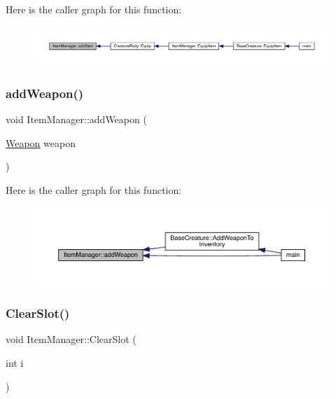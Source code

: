 Here is the caller graph for this function\+:
\nopagebreak
\begin{figure}[H]
\begin{center}
\leavevmode
\includegraphics[width=350pt]{dc/de1/class_item_manager_af86e2b751da18d6d142c29f8c4860323_icgraph}
\end{center}
\end{figure}
\mbox{\label{class_item_manager_a2631fb34c48555098029e18e66d7eb05}} 
\subsubsection{\texorpdfstring{add\+Weapon()}{addWeapon()}}
{\footnotesize\ttfamily void Item\+Manager\+::add\+Weapon (\begin{DoxyParamCaption}\item[{\mbox{\hyperlink{class_weapon}{Weapon}}}]{weapon }\end{DoxyParamCaption})}

Here is the caller graph for this function\+:
\nopagebreak
\begin{figure}[H]
\begin{center}
\leavevmode
\includegraphics[width=350pt]{dc/de1/class_item_manager_a2631fb34c48555098029e18e66d7eb05_icgraph}
\end{center}
\end{figure}
\mbox{\label{class_item_manager_a2aa35a782e14a35ad9477c512e256303}} 
\subsubsection{\texorpdfstring{Clear\+Slot()}{ClearSlot()}}
{\footnotesize\ttfamily void Item\+Manager\+::\+Clear\+Slot (\begin{DoxyParamCaption}\item[{int}]{i }\end{DoxyParamCaption})}

